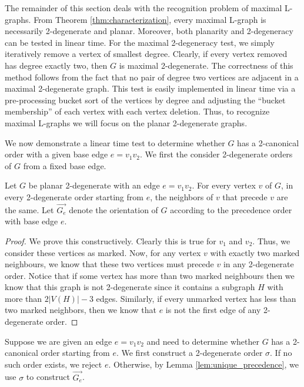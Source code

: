 \documentclass{llncs}
\begin{document}
The remainder of this section deals with the recognition problem of maximal L-graphs. 
From Theorem \ref{thm:characterization}, every maximal L-graph is necessarily 2-degenerate and planar. Moreover, both planarity \cite{Hopcroft1974} and 2-degeneracy can be tested in linear time. 
For the maximal 2-degeneracy test, we simply iteratively remove a vertex of smallest degree. Clearly, if every vertex removed has degree exactly two, then $G$ is maximal 2-degenerate. 
The correctness of this method follows from the fact that no pair of degree two vertices are adjacent in a maximal 2-degenerate graph. 
This test is easily implemented in linear time via a pre-processing bucket sort of the vertices by degree and adjusting the ``bucket membership'' of each vertex with each vertex deletion. 
Thus, to recognize maximal L-graphs we will focus on the planar 2-degenerate graphs.






We now demonstrate a linear time test to determine whether $G$ has a 2-canonical order with a given base edge $e=v_1v_2$. We first the consider 2-degenerate orders of $G$ from a fixed base edge.

\begin{lemma}\label{lem:unique_precedence}
Let $G$ be planar 2-degenerate with an edge $e=v_1v_2$. For every vertex $v$ of $G$, in every 2-degenerate order starting from $e$, the neighbors of $v$ that precede $v$ are the same. Let $\overrightarrow{G_e}$ denote the orientation of $G$ according to the precedence order with base edge $e$. 
\end{lemma}
\begin{proof}
We prove this constructively. Clearly this is true for $v_1$ and $v_2$. Thus, we consider these vertices as marked. Now, for any vertex $v$ with exactly two marked neighbours, we know that these two vertices must precede $v$ in any 2-degenerate order. Notice that if some vertex has more than two marked neighbours then we know that this graph is not 2-degenerate since it contains a subgraph $H$ with more than $2|V(H)| -3$ edges. Similarly, if every unmarked vertex has less than two marked neighbors, then we know that $e$ is not the first edge of any 2-degenerate order. 
\end{proof}

Suppose we are given an edge $e = v_1v_2$ and need to determine whether $G$ has a 2-canonical order starting from $e$. We first construct a 2-degenerate order $\sigma$. If no such order exists, we reject $e$. Otherwise, by Lemma \ref{lem:unique_precedence}, we use $\sigma$ to construct $\overrightarrow{G_e}$. 
\end{document}
